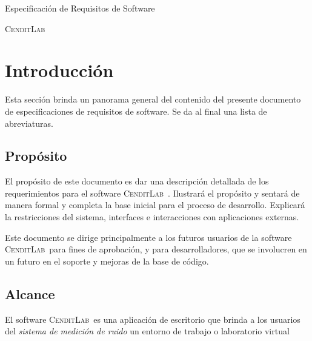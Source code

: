 \documentclass[paper=a4,oneside,fontsize=12pt]{article}
\newcommand{\AppName}{\textsc{CenditLab}\ }
\newcommand{\smr}{sistema de medición de ruido}
\begin{document}
	
	\begin{titlepage}
				
		\begin{center}	
			
			\vspace{10cm}
			
			\begin{Large}			
				Especificación de Requisitos de Software
			\end{Large}
		
			\begin{Huge}
				\textsc{\AppName}
			\end{Huge}
			
		\end{center}
		
	\end{titlepage}

	\tableofcontents
	
	\clearpage
	
	\setlength{\parskip}{1em}
	
	\section{Introducción}
	Esta sección brinda un panorama general del contenido del presente documento de especificaciones de requisitos de software. Se da al final una lista de abreviaturas.
	
	\subsection{Propósito}
	El propósito de este documento es dar una descripción detallada de los requerimientos para el software \AppName. Ilustrará el propósito y sentará de manera formal y completa la base inicial para el proceso de desarrollo. Explicará la restricciones del sistema, interfaces e interacciones con aplicaciones externas. 
	
	Este documento se dirige principalmente a los futuros usuarios de la software \AppName para fines de aprobación, y para desarrolladores, que se involucren en un futuro en el soporte y mejoras de la base de código.
	
	\subsection{Alcance}
	
	El software \AppName es una aplicación de escritorio que brinda a los usuarios del \emph{\smr} un entorno de trabajo o laboratorio virtual 
	
\end{document}
